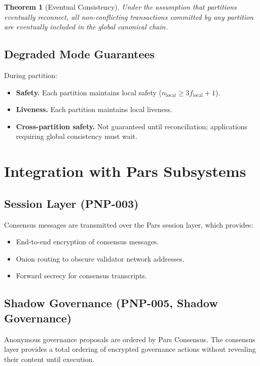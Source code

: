 \documentclass[11pt,a4paper]{article}
\newtheorem{theorem}{Theorem}[section]
\begin{document}
\begin{theorem}[Eventual Consistency]
    Under the assumption that partitions eventually reconnect, all
    non-conflicting transactions committed by any partition are
    eventually included in the global canonical chain.
\end{theorem}

\subsection{Degraded Mode Guarantees}

During partition:
\begin{itemize}
    \item \textbf{Safety.}  Each partition maintains local safety
    ($n_{\mathrm{local}} \geq 3f_{\mathrm{local}} + 1$).
    \item \textbf{Liveness.}  Each partition maintains local liveness.
    \item \textbf{Cross-partition safety.}  Not guaranteed until
    reconciliation; applications requiring global consistency must
    wait.
\end{itemize}

\section{Integration with Pars Subsystems}
\label{sec:integration}

\subsection{Session Layer (PNP-003)}

Consensus messages are transmitted over the Pars session layer, which
provides:
\begin{itemize}
    \item End-to-end encryption of consensus messages.
    \item Onion routing to obscure validator network addresses.
    \item Forward secrecy for consensus transcripts.
\end{itemize}

\subsection{Shadow Governance (PNP-005, Shadow Governance)}

Anonymous governance proposals are ordered by Pars Consensus.  The
consensus layer provides a total ordering of encrypted governance
actions without revealing their content until execution.
\end{document}
